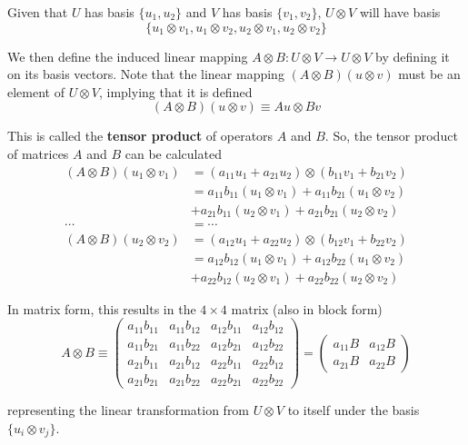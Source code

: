   Given that $U$ has basis $\{u_1, u_2\}$ and $V$ has basis $\{v_1, v_2\}$, $U \otimes V$ will have basis 
  \[\{u_1 \otimes v_1, u_1 \otimes v_2, u_2 \otimes v_1, u_2 \otimes v_2\}\]

  We then define the induced linear mapping $A\otimes B: U \otimes V \longrightarrow U \otimes V$ by defining it on its basis vectors. Note that the linear mapping $(A \otimes B)(u\otimes v)$ must be an element of $U \otimes V$, implying that it is defined
  \[(A \otimes B)(u\otimes v) \equiv Au \otimes Bv\]

  This is called the \textbf{tensor product} of operators $A$ and $B$.
  So, the tensor product of matrices $A$ and $B$ can be calculated
  \begin{align*}
    (A \otimes B) (u_1 \otimes v_1) &= (a_{11} u_1 + a_{21} u_2) \otimes (b_{11} v_1 + b_{21} v_2) \\
    & = a_{11} b_{11} (u_1 \otimes v_1) + a_{11} b_{21} (u_1 \otimes v_2) \\
    & + a_{21} b_{11} (u_2 \otimes v_1) + a_{21} b_{21} (u_2 \otimes v_2) \\
    \cdots & = \cdots \\
    (A \otimes B) (u_2 \otimes v_2) & = (a_{12} u_1 + a_{22} u_2) \otimes (b_{12} v_1 + b_{22} v_2) \\
    & = a_{12} b_{12} (u_1 \otimes v_1) + a_{12} b_{22} (u_1 \otimes v_2) \\
    & + a_{22} b_{12} (u_2 \otimes v_1) + a_{22} b_{22} (u_2 \otimes v_2) 
  \end{align*}

  In matrix form, this results in the $4\times 4$ matrix (also in block form)
  \[A \otimes B \equiv \begin{pmatrix}
  a_{11} b_{11} & a_{11} b_{12} & a_{12} b_{11} & a_{12} b_{12} \\
  a_{11} b_{21} & a_{11} b_{22} & a_{12} b_{21} & a_{12} b_{22} \\
  a_{21} b_{11} & a_{21} b_{12} & a_{22} b_{11} & a_{22} b_{12} \\
  a_{21} b_{21} & a_{21} b_{22} & a_{22} b_{21} & a_{22} b_{22} 
  \end{pmatrix} = \begin{pmatrix}
  a_{11} B & a_{12} B \\
  a_{21} B & a_{22} B 
  \end{pmatrix}\]

  representing the linear transformation from $U \otimes V$ to itself under the basis $\{u_i \otimes v_j\}$. 


